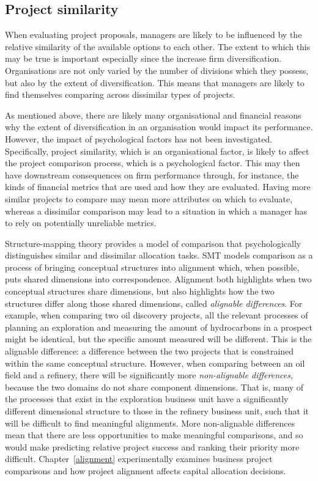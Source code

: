 \documentclass[a4paper, nobind, dvipsnames]{templates/ociamthesis}
\theoremstyle{definition}
\theoremstyle{definition}
\theoremstyle{definition}
\theoremstyle{definition}
\theoremstyle{remark}
\begin{document}
\subsection{Project similarity}

When evaluating project proposals, managers are likely to be influenced by the
relative similarity of the available options to each other. The extent to which
this may be true is important especially since the increase firm
diversification. Organisations are not only varied by the number of divisions
which they possess, but also by the extent of diversification. This means that
managers are likely to find themselves comparing across dissimilar types of
projects.

As mentioned above, there are likely many organisational and financial reasons
why the extent of diversification in an organisation would impact its
performance. However, the impact of psychological factors has not been
investigated. Specifically, project similarity, which is an organisational
factor, is likely to affect the project comparison process, which is a
psychological factor. This may then have downstream consequences on firm
performance through, for instance, the kinds of financial metrics that are used
and how they are evaluated. Having more similar projects to compare may mean
more attributes on which to evaluate, whereas a dissimilar comparison may lead
to a situation in which a manager has to rely on potentially unreliable metrics.

Structure-mapping theory \autocites[SMT;][]{gentner1997,gentner1983} provides a model of
comparison that psychologically distinguishes similar and dissimilar allocation
tasks. SMT models comparison as a process of bringing conceptual structures into
alignment which, when possible, puts shared dimensions into correspondence.
Alignment both highlights when two conceptual structures share dimensions, but
also highlights how the two structures differ along those shared dimensions,
called \emph{alignable differences}. For example, when comparing two oil discovery
projects, all the relevant processes of planning an exploration and measuring
the amount of hydrocarbons in a prospect might be identical, but the specific
amount measured will be different. This is the alignable difference: a
difference between the two projects that is constrained within the same
conceptual structure. However, when comparing between an oil field and a
refinery, there will be significantly more \emph{non-alignable differences}, because
the two domains do not share component dimensions. That is, many of the
processes that exist in the exploration business unit have a significantly
different dimensional structure to those in the refinery business unit, such
that it will be difficult to find meaningful alignments. More non-alignable
differences mean that there are less opportunities to make meaningful
comparisons, and so would make predicting relative project success and ranking
their priority more difficult. Chapter~\ref{alignment} experimentally
examines business project comparisons and how project alignment affects capital
allocation decisions.
\end{document}
